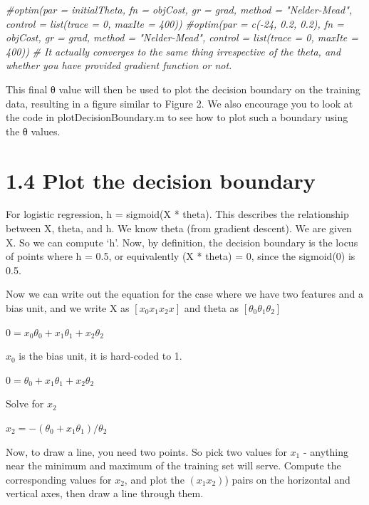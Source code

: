 \documentclass[
]{book}
\newenvironment{Shaded}{\begin{snugshade}}{\end{snugshade}}
\newcommand{\CommentTok}[1]{\textcolor[rgb]{0.56,0.35,0.01}{\textit{#1}}}
\begin{document}
\begin{Shaded}
\begin{Highlighting}[]
\CommentTok{#optim(par = initialTheta, fn = objCost, gr = grad, method = "Nelder-Mead", control = list(trace = 0, maxIte = 400))}
\CommentTok{#optim(par = c(-24, 0.2, 0.2), fn = objCost, gr = grad, method = "Nelder-Mead", control = list(trace = 0, maxIte = 400))}
\CommentTok{# It actually converges to the same thing irrespective of the theta, and whether you have provided gradient function or not.}
\end{Highlighting}
\end{Shaded}

This final θ value will then be used to plot the decision boundary on the training data, resulting in a figure similar to Figure 2. We also encourage you to look at the code in plotDecisionBoundary.m to see how to plot such a boundary using the θ values.

\hypertarget{plot-the-decision-boundary}{%
\section{1.4 Plot the decision boundary}\label{plot-the-decision-boundary}}

For logistic regression, h = sigmoid(X * theta). This describes the relationship between X, theta, and h. We know theta (from gradient descent). We are given X. So we can compute `h'. Now, by definition, the decision boundary is the locus of points where h = 0.5, or equivalently (X * theta) = 0, since the sigmoid(0) is 0.5.

Now we can write out the equation for the case where we have two features and a bias unit, and we write X as \([x_0 x_1 x_2x]\) and theta as \([\theta_0 \theta_1 \theta_2]\)

\(0 = x_0 \theta_0 + x_1 \theta_1 + x_2 \theta_2\)

\(x_0\) is the bias unit, it is hard-coded to 1.

\(0 = \theta_0 + x_1 \theta_1 + x_2 \theta_2\)

Solve for \(x_2\)

\(x_2 = -(\theta_0 + x_1 \theta_1) / \theta_2\)

Now, to draw a line, you need two points. So pick two values for \(x_1\) - anything near the minimum and maximum of the training set will serve. Compute the corresponding values for \(x_2\), and plot the \((x_1 x_2)\)) pairs on the horizontal and vertical axes, then draw a line through them.
\end{document}
